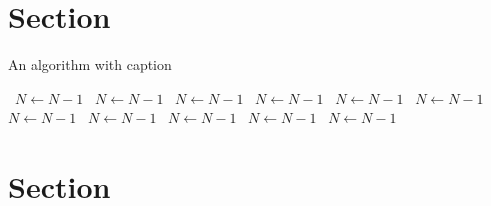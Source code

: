 \documentclass[a4paper]{article}
\begin{document}
\section{Section}

\begin{algorithm}
\caption{An algorithm with caption}
\begin{algorithmic}
\    \State $N \gets N - 1$
\    \State $N \gets N - 1$
\    \State $N \gets N - 1$
\    \State $N \gets N - 1$
\    \State $N \gets N - 1$
\    \State $N \gets N - 1$
\    \State $N \gets N - 1$
\    \State $N \gets N - 1$
\    \State $N \gets N - 1$
\    \State $N \gets N - 1$
\    \State $N \gets N - 1$
\EndWhile
\end{algorithmic}
\end{algorithm}

\section{Section}
\end{document}
